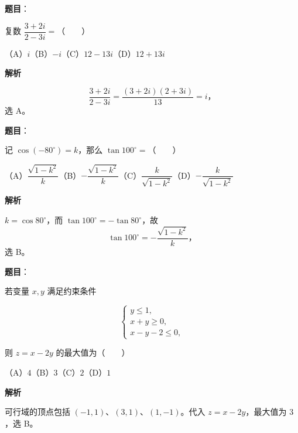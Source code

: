 

\begin{answer}

\textbf{题目}：

复数 $\dfrac{3+2i}{2-3i}=$\mbox{（　　）}

（A）$i$\quad（B）$-i$\quad（C）$12-13i$\quad（D）$12+13i$

\textbf{解析}

\nopagebreak[4]
\[
\frac{3+2i}{2-3i}=\frac{(3+2i)(2+3i)}{13}=i\text{，}
\]
选 A。


\end{answer}
\begin{answer}

\textbf{题目}：

记 $\cos(-80^\circ)=k$，那么 $\tan100^\circ=$\mbox{（　　）}

（A）$\dfrac{\sqrt{1-k^2}}k$\quad（B）$-\dfrac{\sqrt{1-k^2}}k$\quad（C）$\dfrac{k}{\sqrt{1-k^2}}$\quad（D）$-\dfrac{k}{\sqrt{1-k^2}}$

\textbf{解析}

$k=\cos80^\circ$，而 $\tan100^\circ=-\tan80^\circ$，故
\nopagebreak[4]
\[
\tan100^\circ=-\frac{\sqrt{1-k^2}}k\text{，}
\]
选 B。


\end{answer}
\begin{answer}

\textbf{题目}：

若变量 $x,y$ 满足约束条件

\nopagebreak[4]
\[
\begin{cases}
y\leq1,\\
x+y\geq0,\\
x-y-2\leq0,
\end{cases}
\]

则 $z=x-2y$ 的最大值为\mbox{（　　）}

（A）$4$\quad（B）$3$\quad（C）$2$\quad（D）$1$

\textbf{解析}

可行域的顶点包括 $(-1,1)$、$(3,1)$、$(1,-1)$。代入
$z=x-2y$，最大值为 $3$，选 B。


\end{answer}
